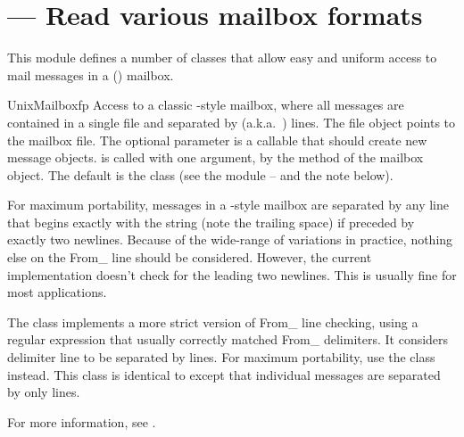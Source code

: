 \section{ ---
         Read various mailbox formats}



This module defines a number of classes that allow easy and uniform
access to mail messages in a (\UNIX) mailbox.

\begin{classdesc}{UnixMailbox}{fp}
Access to a classic \UNIX-style mailbox, where all messages are
contained in a single file and separated by 
(a.k.a.\ ) lines.  The file object  points to the
mailbox file.  The optional  parameter is a callable that
should create new message objects.   is called with one
argument,  by the  method of the mailbox
object.  The default is the  class (see the
 module -- and the note below).


For maximum portability, messages in a \UNIX-style mailbox are
separated by any line that begins exactly with the string  (note the trailing space) if preceded by exactly two newlines.
Because of the wide-range of variations in practice, nothing else on
the From_ line should be considered.  However, the current
implementation doesn't check for the leading two newlines.  This is
usually fine for most applications.

The  class implements a more strict version of
From_ line checking, using a regular expression that usually correctly
matched From_ delimiters.  It considers delimiter line to be separated
by  lines.  For maximum portability,
use the  class instead.  This class is
identical to  except that individual messages are
separated by only  lines.

For more information, see
.
\end{classdesc}

